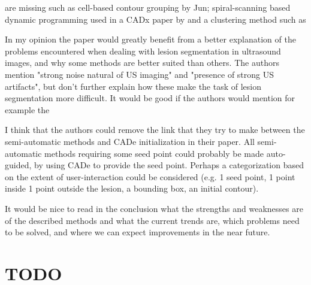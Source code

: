 \documentclass[]{tufte-handout}
\begin{document}
 are missing such as cell-based contour grouping by  Jun; spiral-scanning based dynamic programming used in a CADx paper by  and a clustering method such as 

In my opinion the paper would greatly benefit from a better explanation of the problems encountered when dealing with lesion segmentation in ultrasound images, and why some methods are better suited than others. The authors mention "strong noise natural of US imaging" and "presence of strong US artifacts", but don't further explain how these make the task of lesion segmentation more difficult. It would be good if the authors would mention for example the 

I think that the authors could remove the link that they try to make between the semi-automatic methods and CADe initialization in their paper. All semi-automatic methods requiring some seed point could probably be made auto-guided, by using CADe to provide the seed point. Perhaps a categorization based on the extent of user-interaction could be considered (e.g. 1 seed point, 1 point inside 1 point outside the lesion, a bounding box, an initial contour).

It would be nice to read in the conclusion what the strengths and weaknesses are of the described methods and what the current trends are, which problems need to be solved, and where we can expect improvements in the near future.

\section{TODO}
\listoftodos
\end{document}

